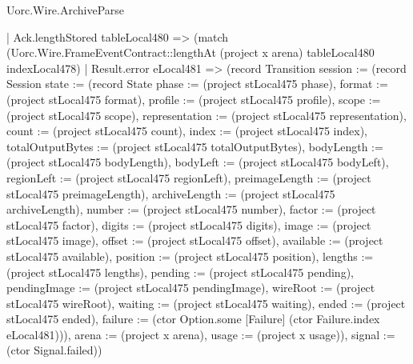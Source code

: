 \begin{lexlean}{Uorc.Wire.ArchiveParse}
\begin{semanticmodule}
{          | Ack.lengthStored tableLocal480 => (match (Uorc.Wire.FrameEventContract::lengthAt (project x arena) tableLocal480 indexLocal478)
            | Result.error eLocal481 => (record Transition {session := (record Session {state := (record State {phase := (project stLocal475 phase), format := (project stLocal475 format), profile := (project stLocal475 profile), scope := (project stLocal475 scope), representation := (project stLocal475 representation), count := (project stLocal475 count), index := (project stLocal475 index), totalOutputBytes := (project stLocal475 totalOutputBytes), bodyLength := (project stLocal475 bodyLength), bodyLeft := (project stLocal475 bodyLeft), regionLeft := (project stLocal475 regionLeft), preimageLength := (project stLocal475 preimageLength), archiveLength := (project stLocal475 archiveLength), number := (project stLocal475 number), factor := (project stLocal475 factor), digits := (project stLocal475 digits), image := (project stLocal475 image), offset := (project stLocal475 offset), available := (project stLocal475 available), position := (project stLocal475 position), lengths := (project stLocal475 lengths), pending := (project stLocal475 pending), pendingImage := (project stLocal475 pendingImage), wireRoot := (project stLocal475 wireRoot), waiting := (project stLocal475 waiting), ended := (project stLocal475 ended), failure := (ctor Option.some [Failure] (ctor Failure.index eLocal481))}), arena := (project x arena), usage := (project x usage)}), signal := (ctor Signal.failed)})
}
\end{semanticmodule}
\end{lexlean}
